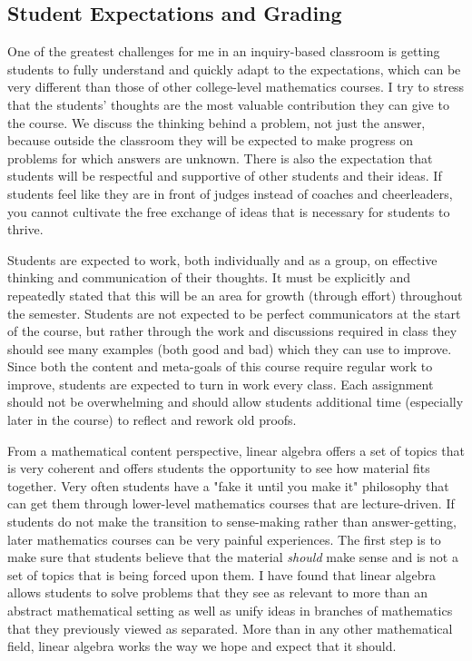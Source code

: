 \begin{annotation}
\subsection{Student Expectations and Grading}
One of the greatest challenges for me in an inquiry-based classroom is getting students to fully understand and quickly adapt to the expectations, which can be very different than those of other college-level mathematics courses. I try to stress that the students' thoughts are the most valuable contribution they can give to the course. We discuss the thinking behind a problem, not just the answer, because outside the classroom they will be expected to make progress on problems for which answers are unknown. There is also the expectation that students will be respectful and supportive of other students and their ideas. If students feel like they are in front of judges instead of coaches and cheerleaders, you cannot cultivate the free exchange of ideas that is necessary for students to thrive.

Students are expected to work, both individually and as a group, on effective thinking and communication of their thoughts. It must be explicitly and repeatedly stated that this will be an area for growth (through effort) throughout the semester. Students are not expected to be perfect communicators at the start of the course, but rather through the work and discussions required in class they should see many examples (both good and bad) which they can use to improve. Since both the content and meta-goals of this course require regular work to improve, students are expected to turn in work every class. Each assignment should not be overwhelming and should allow students additional time (especially later in the course) to reflect and rework old proofs.

From a mathematical content perspective, linear algebra offers a set of topics that is very coherent and offers students the opportunity to see how material fits together. Very often students have a "fake it until you make it" philosophy that can get them through lower-level mathematics courses that are lecture-driven. If students do not make the transition to sense-making rather than answer-getting, later mathematics courses can be very painful experiences. The first step is to make sure that students believe that the material \emph{should} make sense and is not a set of topics that is being forced upon them. I have found that linear algebra allows students to solve problems that they see as relevant to more than an abstract mathematical setting as well as unify ideas in branches of mathematics that they previously viewed as separated. More than in any other mathematical field, linear algebra works the way we hope and expect that it should.


\end{annotation}
